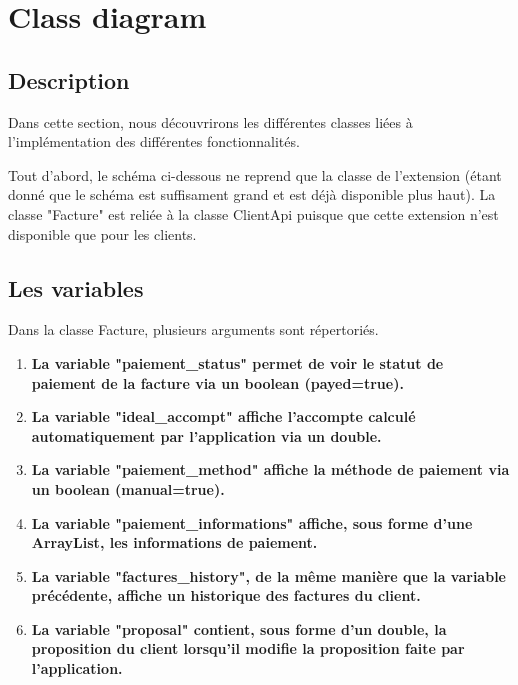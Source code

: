 \section{Class diagram}
\subsection{Description}
\begin{flushleft}
Dans cette section, nous découvrirons les différentes classes liées à l'implémentation des différentes fonctionnalités.
\end{flushleft}

\begin{flushleft}
Tout d'abord, le schéma ci-dessous ne reprend que la classe de l'extension (étant donné que le schéma est suffisament grand et est déjà disponible plus haut). La classe "Facture" est reliée à la classe ClientApi puisque que cette extension n'est disponible que pour les clients.
\end{flushleft}

\subsection{Les variables}
\begin{flushleft}
Dans la classe Facture, plusieurs arguments sont répertoriés.
\end{flushleft}

\begin{enumerate}[-]

\item \textbf{La variable "paiement_status" permet de voir le statut de paiement de la facture via un boolean (payed=true).}

\item \textbf{La variable "ideal_accompt" affiche l'accompte calculé automatiquement par l'application via un double.}

\item \textbf{La variable "paiement_method" affiche la méthode de paiement via un boolean (manual=true).}

\item \textbf{La variable "paiement_informations" affiche, sous forme d'une ArrayList, les informations de paiement.}

\item \textbf{La variable "factures_history", de la même manière que la variable précédente, affiche un historique des factures du client.}

\item \textbf{La variable "proposal" contient, sous forme d'un double, la proposition du client lorsqu'il modifie la proposition faite par l'application.}

\end{enumerate}

